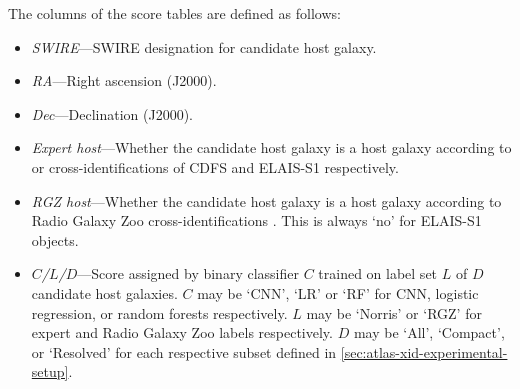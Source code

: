   The columns of the score tables are defined as follows:
  \begin{itemize}
    \item \emph{SWIRE}---SWIRE designation for candidate host galaxy.
    \item \emph{RA}---Right ascension (J2000).
    \item \emph{Dec}---Declination (J2000).
    \item \emph{Expert host}---Whether the candidate host galaxy is a host galaxy according to \citet{norris06} or \citet{middelberg08} cross-identifications of CDFS and ELAIS-S1 respectively.
    \item \emph{RGZ host}---Whether the candidate host galaxy is a host galaxy according to Radio Galaxy Zoo cross-identifications \citep{wong21rgz}. This is always `no' for ELAIS-S1 objects.
    \item \emph{$C$/$L$/$D$}---Score assigned by binary classifier $C$ trained on label set $L$ of $D$ candidate host galaxies. $C$ may be `CNN', `LR' or `RF' for CNN, logistic regression, or random forests respectively. $L$ may be `Norris' or `RGZ' for expert and Radio Galaxy Zoo labels respectively. $D$ may be `All', `Compact', or `Resolved' for each respective subset defined in \autoref{sec:atlas-xid-experimental-setup}.
  \end{itemize}

